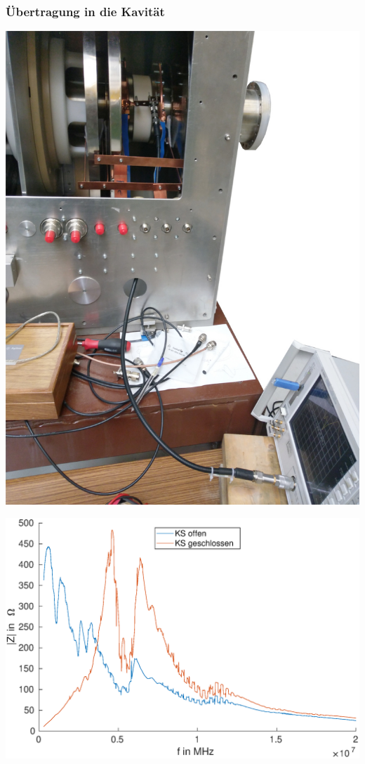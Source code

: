 \documentclass[accentcolor=tud9b, colorbacktitle, inverttitle]{tudbeamer}
\begin{document}
\begin{frame}\frametitle{\"Ubertragung in die Kavit\"at}
\begin{minipage}[t]{0.33\textwidth}
	\includegraphics[width=\textwidth]{Messung_Kavitaet_NA_crop}
\end{minipage}
\begin{minipage}[t]{0.6\textwidth}
	\includegraphics[width=\textwidth]{Z_ges_cavity}
\end{minipage}
\end{frame}
\end{document}
